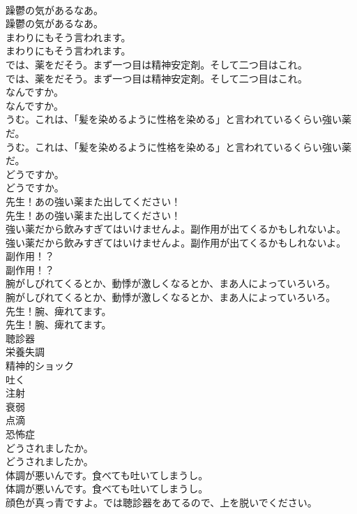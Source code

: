 \documentclass[8pt]{extreport}
\begin{document}
\begin{CJK}{UTF8}{min}
\\	躁鬱の気があるなあ。	
\\	躁鬱の気があるなあ。 
\\	まわりにもそう言われます。	
\\	まわりにもそう言われます。 
\\	では、薬をだそう。まず一つ目は精神安定剤。そして二つ目はこれ。	
\\	では、薬をだそう。まず一つ目は精神安定剤。そして二つ目はこれ。 
\\	なんですか。	
\\	なんですか。 
\\	うむ。これは、「髪を染めるように性格を染める」と言われているくらい強い薬だ。	
\\	うむ。これは、「髪を染めるように性格を染める」と言われているくらい強い薬だ。 
\\	どうですか。	
\\	どうですか。 
\\	先生！あの強い薬また出してください！	
\\	先生！あの強い薬また出してください！ 
\\	強い薬だから飲みすぎてはいけませんよ。副作用が出てくるかもしれないよ。	
\\	強い薬だから飲みすぎてはいけませんよ。副作用が出てくるかもしれないよ。 
\\	副作用！？	
\\	副作用！？ 
\\	腕がしびれてくるとか、動悸が激しくなるとか、まあ人によっていろいろ。	
\\	腕がしびれてくるとか、動悸が激しくなるとか、まあ人によっていろいろ。 
\\	先生！腕、痺れてます。	
\\	先生！腕、痺れてます。 
\\	聴診器
\\	栄養失調
\\	精神的ショック
\\	吐く
\\	注射
\\	衰弱
\\	点滴
\\	恐怖症
\\	どうされましたか。	
\\	どうされましたか。 
\\	体調が悪いんです。食べても吐いてしまうし。	
\\	体調が悪いんです。食べても吐いてしまうし。 
\\	顔色が真っ青ですよ。では聴診器をあてるので、上を脱いでください。	

\end{CJK}
\end{document}

